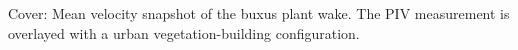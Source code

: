 \thispagestyle{empty}

\hfill

\vfill

\noindent Cover: Mean velocity snapshot of the buxus plant wake. The PIV measurement is overlayed with a urban vegetation-building configuration.\\

\bigskip


%
%

%
%
%
%
%
